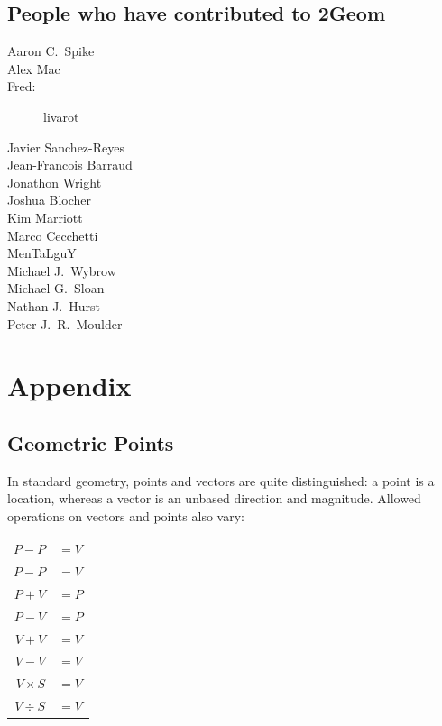 \documentclass[openany]{book}
\begin{document}
\section{People who have contributed to 2Geom}
\begin{description}
\item[Aaron C.\ Spike]
\item[Alex Mac]
\item[Fred:] livarot
\item[Javier Sanchez-Reyes]
\item[Jean-Francois Barraud]
\item[Jonathon Wright]
\item[Joshua Blocher]
\item[Kim Marriott]
\item[Marco Cecchetti]
\item[MenTaLguY]
\item[Michael J.\ Wybrow]
\item[Michael G.\ Sloan]
\item[Nathan J.\ Hurst]
\item[Peter J.\ R.\ Moulder]
\end{description}

\chapter{Appendix}
\renewcommand{\thesection}{\Alph{section}}

\section{Geometric Points}
In standard geometry, points and vectors are quite distinguished: a
point is a location, whereas a vector is an unbased direction and
magnitude.  Allowed operations on vectors and points also vary:

\begin{tabular}{r l}
  $P - P$ & $= V$ \\

  $P - P$ & $= V$ \\

  $P + V$ & $= P$ \\

  $P - V$ & $= P$ \\

  $V + V$ & $= V$ \\

  $V - V$ & $= V$ \\

  $V \times S$ & $= V$ \\

  $V \div S$ & $= V$ \\
\end{tabular}
\end{document}
